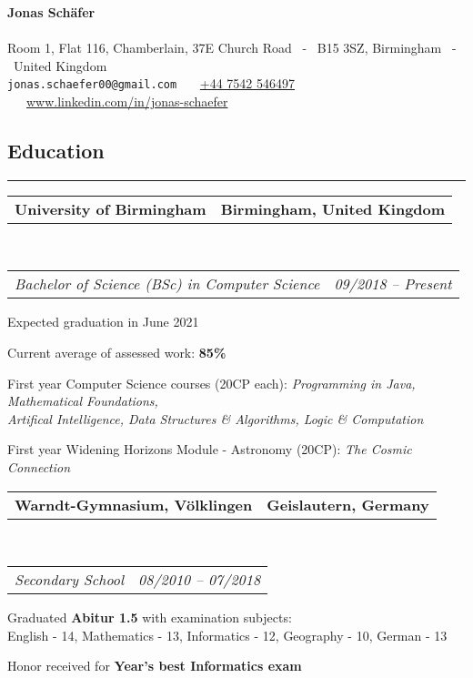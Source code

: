 \documentclass[10pt,letterpaper]{article}
\makeatletter
\newcommand{\headerrow}[2]
{\begin{tabular*}{\linewidth}{l@{\extracolsep{\fill}}r}
	#1 &
	#2 \\
\end{tabular*}}
\makeatother
\begin{document}
\begin{center}
{\LARGE \textbf{Jonas Schäfer}}
\\
\ \\
Room 1, Flat 116, Chamberlain, 37E Church Road \ - \ B15 3SZ, Birmingham \ - \ United Kingdom
\\
\texttt{jonas.schaefer00@gmail.com} \ \textbullet \ \ \href{tel:+447542546497}{+44 7542 546497}‬ \ \textbullet \ \ \href{https://www.linkedin.com/in/jonas-schaefer/}{www.linkedin.com/in/jonas-schaefer}
\end{center}

\subsection*{Education}
\hrule
\vspace{0.4em}

\noindent
\headerrow{\textbf{University of Birmingham}}{\textbf{Birmingham, United Kingdom}}
\\
\headerrow{\emph{Bachelor of Science (BSc) in Computer Science}}{\emph{09/2018 -- Present}}
\vspace{-1.6em}
\begin{itemize*}
    \item Expected graduation in June 2021
	\item Current average of assessed work: \textbf{85\footnotesize{\%}}
    \item First year Computer Science courses (20CP each): \emph{Programming in Java, Mathematical Foundations, \\Artifical Intelligence, Data Structures \& Algorithms, Logic \& Computation}
    \item First year Widening Horizons Module - Astronomy (20CP): \emph{The Cosmic Connection}


\end{itemize*}

\noindent
\headerrow{\textbf{Warndt-Gymnasium, Völklingen}}{\textbf{Geislautern, Germany}}
\\
\headerrow{\emph{Secondary School}}{\emph{08/2010 -- 07/2018}}
\vspace{-1.6em}
\begin{itemize*}
	\item Graduated \textbf{Abitur 1.5} with examination subjects:\\
       English - 14, Mathematics - 13, Informatics - 12, Geography - 10,
       German - 13
    \item Honor received for \textbf{Year's best Informatics exam}

\end{itemize*}
\end{document}

